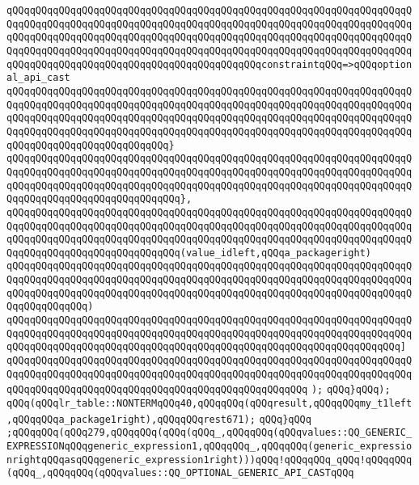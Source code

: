 \verb|qQQqqQQqqQQqqQQqqQQqqQQqqQQqqQQqqQQqqQQqqQQqqQQqqQQqqQQqqQQqqQQqqQQqqQQqqQQqqQQqqQQqqQQqqQQqqQQqqQQqqQQqqQQqqQQqqQQqqQQqqQQqqQQqqQQqqQQqqQQqqQQqqQQqqQQqqQQqqQQqqQQqqQQqqQQqqQQqqQQqqQQqqQQqqQQqqQQqqQQqqQQqqQQqqQQqqQQqqQQqqQQqqQQqqQQqqQQqqQQqqQQqqQQqqQQqqQQqqQQqqQQqqQQqqQQqqQQqqQQqqQQqqQQqqQQqqQQqqQQqqQQqqQQqqQQqqQQqqQQqqQQqconstraintqQQq=>qQQqoptional_api_cast|\newline
\verb|qQQqqQQqqQQqqQQqqQQqqQQqqQQqqQQqqQQqqQQqqQQqqQQqqQQqqQQqqQQqqQQqqQQqqQQqqQQqqQQqqQQqqQQqqQQqqQQqqQQqqQQqqQQqqQQqqQQqqQQqqQQqqQQqqQQqqQQqqQQqqQQqqQQqqQQqqQQqqQQqqQQqqQQqqQQqqQQqqQQqqQQqqQQqqQQqqQQqqQQqqQQqqQQqqQQqqQQqqQQqqQQqqQQqqQQqqQQqqQQqqQQqqQQqqQQqqQQqqQQqqQQqqQQqqQQqqQQqqQQqqQQqqQQqqQQqqQQqqQQqqQQqqQQq}|\newline
\verb|qQQqqQQqqQQqqQQqqQQqqQQqqQQqqQQqqQQqqQQqqQQqqQQqqQQqqQQqqQQqqQQqqQQqqQQqqQQqqQQqqQQqqQQqqQQqqQQqqQQqqQQqqQQqqQQqqQQqqQQqqQQqqQQqqQQqqQQqqQQqqQQqqQQqqQQqqQQqqQQqqQQqqQQqqQQqqQQqqQQqqQQqqQQqqQQqqQQqqQQqqQQqqQQqqQQqqQQqqQQqqQQqqQQqqQQqqQQqqQQq},|\newline
\verb|qQQqqQQqqQQqqQQqqQQqqQQqqQQqqQQqqQQqqQQqqQQqqQQqqQQqqQQqqQQqqQQqqQQqqQQqqQQqqQQqqQQqqQQqqQQqqQQqqQQqqQQqqQQqqQQqqQQqqQQqqQQqqQQqqQQqqQQqqQQqqQQqqQQqqQQqqQQqqQQqqQQqqQQqqQQqqQQqqQQqqQQqqQQqqQQqqQQqqQQqqQQqqQQqqQQqqQQqqQQqqQQqqQQqqQQqqQQqqQQq(value_idleft,qQQqa_packageright)|\newline
\verb|qQQqqQQqqQQqqQQqqQQqqQQqqQQqqQQqqQQqqQQqqQQqqQQqqQQqqQQqqQQqqQQqqQQqqQQqqQQqqQQqqQQqqQQqqQQqqQQqqQQqqQQqqQQqqQQqqQQqqQQqqQQqqQQqqQQqqQQqqQQqqQQqqQQqqQQqqQQqqQQqqQQqqQQqqQQqqQQqqQQqqQQqqQQqqQQqqQQqqQQqqQQqqQQqqQQqqQQqqQQqqQQq)|\newline
\verb|qQQqqQQqqQQqqQQqqQQqqQQqqQQqqQQqqQQqqQQqqQQqqQQqqQQqqQQqqQQqqQQqqQQqqQQqqQQqqQQqqQQqqQQqqQQqqQQqqQQqqQQqqQQqqQQqqQQqqQQqqQQqqQQqqQQqqQQqqQQqqQQqqQQqqQQqqQQqqQQqqQQqqQQqqQQqqQQqqQQqqQQqqQQqqQQqqQQqqQQqqQQqqQQq]|\newline
\verb|qQQqqQQqqQQqqQQqqQQqqQQqqQQqqQQqqQQqqQQqqQQqqQQqqQQqqQQqqQQqqQQqqQQqqQQqqQQqqQQqqQQqqQQqqQQqqQQqqQQqqQQqqQQqqQQqqQQqqQQqqQQqqQQqqQQqqQQqqQQqqQQqqQQqqQQqqQQqqQQqqQQqqQQqqQQqqQQqqQQqqQQqqQQqqQQq|\newline
\verb|);|\newline
\verb|qQQq}qQQq);|\newline
\verb|qQQq(qQQqlr_table::NONTERMqQQq40,qQQqqQQq(qQQqresult,qQQqqQQqmy_t1left,qQQqqQQqa_package1right),qQQqqQQqrest671);|\newline
\verb|qQQq}qQQq|\newline
\verb|;qQQqqQQq(qQQq279,qQQqqQQq(qQQq(qQQq_,qQQqqQQq(qQQqvalues::QQ_GENERIC_EXPRESSIONqQQqgeneric_expression1,qQQqqQQq_,qQQqqQQq(generic_expressionrightqQQqasqQQqgeneric_expression1right)))qQQq!qQQqqQQq_qQQq!qQQqqQQq(qQQq_,qQQqqQQq(qQQqvalues::QQ_OPTIONAL_GENERIC_API_CASTqQQq|\newline

